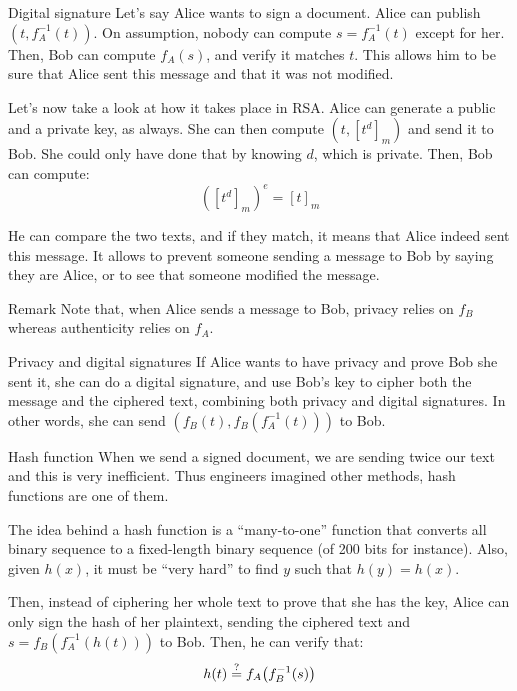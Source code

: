 \documentclass[a4paper]{article}
\begin{document}
\begin{parag}{Digital signature}
     Let's say Alice wants to sign a document. Alice can publish $\left(t, f_A^{-1}\left(t\right)\right)$. On assumption, nobody can compute $s = f_A^{-1}\left(t\right)$ except for her. Then, Bob can compute $f_A\left(s\right)$, and verify it matches $t$. This allows him to be sure that Alice sent this message and that it was not modified.

     Let's now take a look at how it takes place in RSA. Alice can generate a public and a private key, as always. She can then compute $\left(t, \left[t^{d}\right]_{m}\right)$ and send it to Bob. She could only have done that by knowing $d$, which is private. Then, Bob can compute: 
     \[\left(\left[t^{d}\right]_m\right)^e = \left[t\right]_m\]

    He can compare the two texts, and if they match, it means that Alice indeed sent this message. It allows to prevent someone sending a message to Bob by saying they are Alice, or to see that someone modified the message.

    \begin{subparag}{Remark}
        Note that, when Alice sends a message to Bob, privacy relies on $f_B$ whereas authenticity relies on $f_A$.
    \end{subparag}
\end{parag}

\begin{parag}{Privacy and digital signatures}
    If Alice wants to have privacy and prove Bob she sent it, she can do a digital signature, and use Bob's key to cipher both the message and the ciphered text, combining both privacy and digital signatures. In other words, she can send $\left(f_B\left(t\right), f_B\left(f_A^{-1}\left(t\right)\right)\right)$ to Bob.

\end{parag}
 
 
\begin{parag}{Hash function}
     When we send a signed document, we are sending twice our text and this is very inefficient. Thus engineers imagined other methods, hash functions are one of them.

     The idea behind a hash function is a ``many-to-one'' function that converts all binary sequence to a fixed-length binary sequence (of 200 bits for instance). Also, given $h\left(x\right)$, it must be ``very hard'' to find $y$ such that $h\left(y\right) = h\left(x\right)$.

     Then, instead of ciphering her whole text to prove that she has the key, Alice can only sign the hash of her plaintext, sending the ciphered text and $s = f_B\left(f_A^{-1}\left(h\left(t\right)\right)\right)$ to Bob. Then, he can verify that: 
     \[h\left(t\right) \over{=}{\text{?}} f_A\left(f_B^{-1}\left(s\right)\right)\]
\end{parag}
\end{document}
